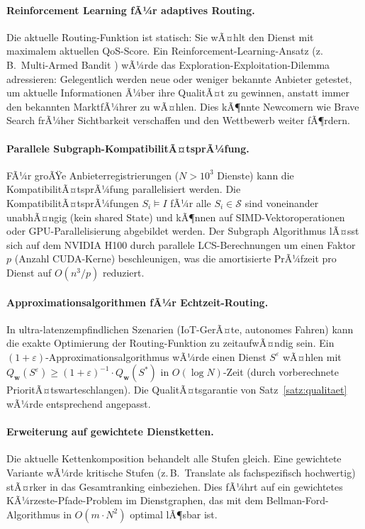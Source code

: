 ﻿\documentclass[a4paper,12pt]{article}
\theoremstyle{definition}
\begin{document}
\paragraph{Reinforcement Learning fÃ¼r adaptives Routing.}
Die aktuelle Routing-Funktion ist statisch: Sie wÃ¤hlt den Dienst mit maximalem aktuellen QoS-Score. Ein Reinforcement-Learning-Ansatz (z.\,B.\ Multi-Armed Bandit \cite{auer2002}) wÃ¼rde das Exploration-Exploitation-Dilemma adressieren: Gelegentlich werden neue oder weniger bekannte Anbieter getestet, um aktuelle Informationen Ã¼ber ihre QualitÃ¤t zu gewinnen, anstatt immer den bekannten MarktfÃ¼hrer zu wÃ¤hlen. Dies kÃ¶nnte Newcomern wie Brave Search frÃ¼her Sichtbarkeit verschaffen und den Wettbewerb weiter fÃ¶rdern.

\paragraph{Parallele Subgraph-KompatibilitÃ¤tsprÃ¼fung.}
FÃ¼r groÃŸe Anbieterregistrierungen ($N > 10^3$ Dienste) kann die KompatibilitÃ¤tsprÃ¼fung parallelisiert werden. Die KompatibilitÃ¤tsprÃ¼fungen $S_i \models I$ fÃ¼r alle $S_i \in \mathcal{S}$ sind voneinander unabhÃ¤ngig (kein shared State) und kÃ¶nnen auf SIMD-Vektoroperationen oder GPU-Parallelisierung abgebildet werden. Der Subgraph Algorithmus lÃ¤sst sich auf dem NVIDIA H100 durch parallele LCS-Berechnungen um einen Faktor $p$ (Anzahl CUDA-Kerne) beschleunigen, was die amortisierte PrÃ¼fzeit pro Dienst auf $O(n^3 / p)$ reduziert.

\paragraph{Approximationsalgorithmen fÃ¼r Echtzeit-Routing.}
In ultra-latenzempfindlichen Szenarien (IoT-GerÃ¤te, autonomes Fahren) kann die exakte Optimierung der Routing-Funktion zu zeitaufwÃ¤ndig sein. Ein $(1+\varepsilon)$-Approximationsalgorithmus wÃ¼rde einen Dienst $S^{\varepsilon}$ wÃ¤hlen mit $Q_\mathbf{w}(S^{\varepsilon}) \geq (1+\varepsilon)^{-1} \cdot Q_\mathbf{w}(S^*)$ in $O(\log N)$-Zeit (durch vorberechnete PrioritÃ¤tswarteschlangen). Die QualitÃ¤tsgarantie von Satz~\ref{satz:qualitaet} wÃ¼rde entsprechend angepasst.

\paragraph{Erweiterung auf gewichtete Dienstketten.}
Die aktuelle Kettenkomposition behandelt alle Stufen gleich. Eine gewichtete Variante wÃ¼rde kritische Stufen (z.\,B.\ Translate als fachspezifisch hochwertig) stÃ¤rker in das Gesamtranking einbeziehen. Dies fÃ¼hrt auf ein gewichtetes KÃ¼rzeste-Pfade-Problem im Dienstgraphen, das mit dem Bellman-Ford-Algorithmus in $O(m \cdot N^2)$ optimal lÃ¶sbar ist.
\end{document}
